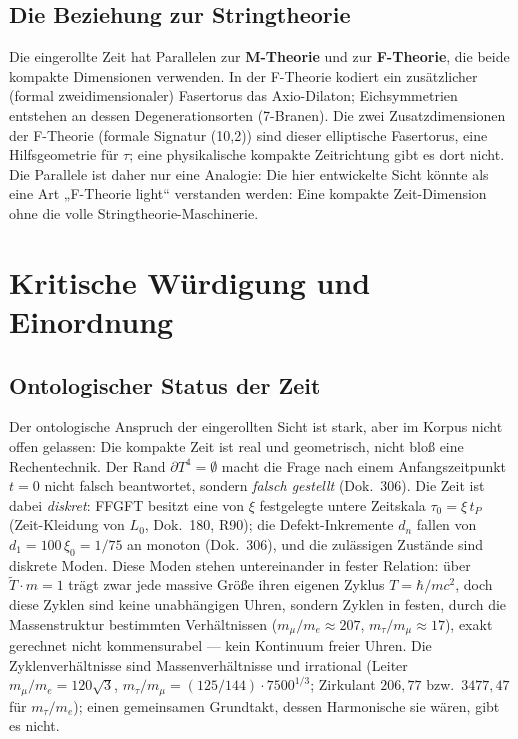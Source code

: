 \subsection{Die Beziehung zur Stringtheorie}

Die eingerollte Zeit hat Parallelen zur \textbf{M-Theorie} und zur \textbf{F-Theorie}, die beide kompakte Dimensionen verwenden. In der F-Theorie kodiert ein zusätzlicher (formal zweidimensionaler) Fasertorus das Axio-Dilaton; Eichsymmetrien entstehen an dessen Degenerationsorten (7-Branen). Die zwei Zusatzdimensionen der F-Theorie (formale Signatur (10,2)) sind dieser elliptische Fasertorus, eine Hilfsgeometrie für $\tau$; eine physikalische kompakte Zeitrichtung gibt es dort nicht. Die Parallele ist daher nur eine Analogie: Die hier entwickelte Sicht könnte als eine Art „F-Theorie light`` verstanden werden: Eine kompakte Zeit-Dimension ohne die volle Stringtheorie-Maschinerie.

\section{Kritische Würdigung und Einordnung}

\subsection{Ontologischer Status der Zeit}

Der ontologische Anspruch der eingerollten Sicht ist stark, aber im Korpus nicht offen gelassen: Die kompakte Zeit ist real und geometrisch, nicht bloß eine Rechentechnik. Der Rand $\partial T^4 = \emptyset$ macht die Frage nach einem Anfangszeitpunkt $t=0$ nicht falsch beantwortet, sondern \emph{falsch gestellt} (Dok.~306). Die Zeit ist dabei \emph{diskret}: FFGFT besitzt eine von $\xi$ festgelegte untere Zeitskala $\tau_0 = \xi\,t_P$ (Zeit-Kleidung von $L_0$, Dok.~180, R90); die Defekt-Inkremente $d_n$ fallen von $d_1 = 100\,\xi_0 = 1/75$ an monoton (Dok.~306), und die zulässigen Zustände sind diskrete Moden. Diese Moden stehen untereinander in fester Relation: über $\tilde T\cdot m = 1$ trägt zwar jede massive Größe ihren eigenen Zyklus $T=\hbar/mc^2$, doch diese Zyklen sind keine unabhängigen Uhren, sondern Zyklen in festen, durch die Massenstruktur bestimmten Verhältnissen ($m_\mu/m_e \approx 207$, $m_\tau/m_\mu \approx 17$), exakt gerechnet nicht kommensurabel --- kein Kontinuum freier Uhren. Die Zyklenverhältnisse sind Massenverhältnisse und irrational (Leiter $m_\mu/m_e=120\sqrt3$, $m_\tau/m_\mu=(125/144)\cdot7500^{1/3}$; Zirkulant $206{,}77$ bzw.\ $3477{,}47$ für $m_\tau/m_e$); einen gemeinsamen Grundtakt, dessen Harmonische sie wären, gibt es nicht.

